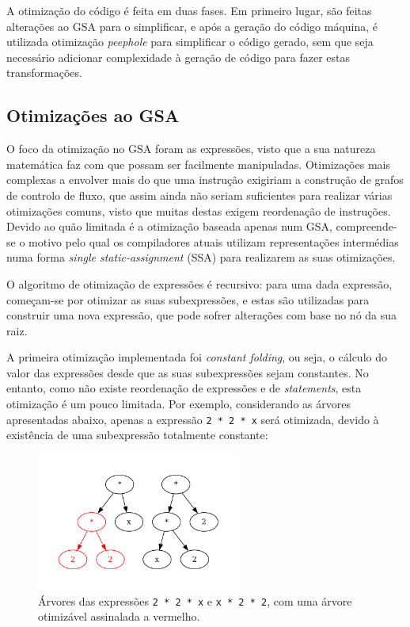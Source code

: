 \documentclass[12pt, a4paper]{article}
\begin{document}
A otimização do código é feita em duas fases. Em primeiro lugar, são feitas alterações ao GSA para o
simplificar, e após a geração do código máquina, é utilizada otimização \emph{peephole} para
simplificar o código gerado, sem que seja necessário adicionar complexidade à geração de código para
fazer estas transformações.

\subsection{Otimizações ao GSA}

O foco da otimização no GSA foram as expressões, visto que a sua natureza matemática faz com que
possam ser facilmente manipuladas. Otimizações mais complexas a envolver mais do que uma instrução
exigiriam a construção de grafos de controlo de fluxo, que assim ainda não seriam suficientes para
realizar várias otimizações comuns, visto que muitas destas exigem reordenação de instruções. Devido
ao quão limitada é a otimização baseada apenas num GSA, compreende-se o motivo pelo qual os
compiladores atuais utilizam representações intermédias numa forma \emph{single static-assignment}
(SSA) para realizarem as suas otimizações.

O algoritmo de otimização de expressões é recursivo: para uma dada expressão, começam-se por
otimizar as suas subexpressões, e estas são utilizadas para construir uma nova expressão, que pode
sofrer alterações com base no nó da sua raiz.

A primeira otimização implementada foi \emph{constant folding}, ou seja, o cálculo do valor das
expressões desde que as suas subexpressões sejam constantes. No entanto, como não existe reordenação
de expressões e de \emph{statements}, esta otimização é um pouco limitada. Por exemplo, considerando
as árvores apresentadas abaixo, apenas a expressão \texttt{2 * 2 * x} será otimizada, devido à
existência de uma subexpressão totalmente constante:

\begin{figure}[H]
    \centering
    \includegraphics[width=0.6\textwidth]{res/expression-trees.pdf}
    \caption{
        Árvores das expressões \texttt{2 * 2 * x} e \texttt{x * 2 * 2}, com uma árvore otimizável
        assinalada a vermelho.
    }
\end{figure}
\end{document}
